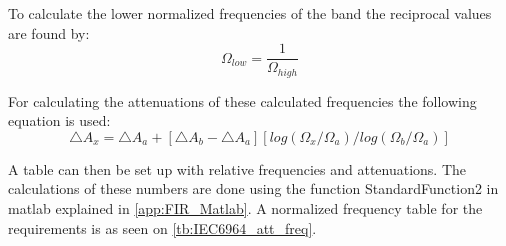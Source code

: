 To calculate the lower normalized frequencies of the band the reciprocal values are found by:
\begin{equation}
\Omega_{low} = \frac{1}{\Omega_{high}}
\end{equation}

For calculating the attenuations of these calculated frequencies the following equation is used:
\begin{equation}
\triangle A_x=\triangle A_a+[\triangle A_b-\triangle A_a][log(\Omega_x/\Omega_a)/log(\Omega_b/\Omega_a)]
\end{equation}
\begin{where}
\end{where}

A table can then be set up with relative frequencies and attenuations. The calculations of these numbers are done using the function StandardFunction2 in matlab explained in \autoref{app:FIR_Matlab}. A normalized frequency table for the requirements is as seen on \autoref{tb:IEC6964_att_freq}. 

